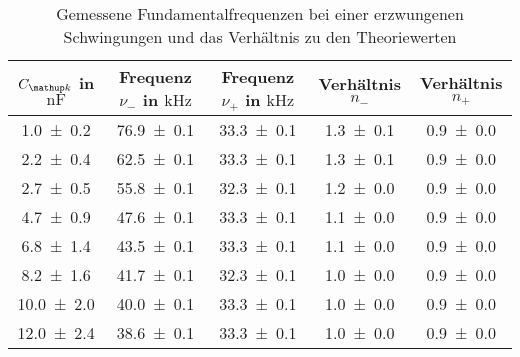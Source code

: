 \begin{table} 
\centering 
\caption{Gemessene Fundamentalfrequenzen bei einer erzwungenen Schwingungen und das Verhältnis zu den Theoriewerten} 
\label{fig:teilb_schwingungen_prak_theo} 
\begin{tabular}{S S S S S } 
\toprule  
{$C\ua{k}$ in $\si{\nano\farad}$} & {Frequenz $\nu_-$ in $\si{\kilo\hertz}$} & {Frequenz $\nu_+$ in $\si{\kilo\hertz}$}& {Verhältnis $n_-$} & {Verhältnis $n_+$}  \\ 
\midrule  
 \num{1.0\pm0.2} & \num{76.9\pm0.1} & \num{33.3\pm0.1} & \num{1.3\pm0.1} & \num{0.9\pm0.0}\\ 
\num{2.2\pm0.4} & \num{62.5\pm0.1} & \num{33.3\pm0.1} & \num{1.3\pm0.1} & \num{0.9\pm0.0}\\ 
\num{2.7\pm0.5} & \num{55.8\pm0.1} & \num{32.3\pm0.1} & \num{1.2\pm0.0} & \num{0.9\pm0.0}\\ 
\num{4.7\pm0.9} & \num{47.6\pm0.1} & \num{33.3\pm0.1} & \num{1.1\pm0.0} & \num{0.9\pm0.0}\\ 
\num{6.8\pm1.4} & \num{43.5\pm0.1} & \num{33.3\pm0.1} & \num{1.1\pm0.0} & \num{0.9\pm0.0}\\ 
\num{8.2\pm1.6} & \num{41.7\pm0.1} & \num{32.3\pm0.1} & \num{1.0\pm0.0} & \num{0.9\pm0.0}\\ 
\num{10.0\pm2.0} & \num{40.0\pm0.1} & \num{33.3\pm0.1} & \num{1.0\pm0.0} & \num{0.9\pm0.0}\\ 
\num{12.0\pm2.4} & \num{38.6\pm0.1} & \num{33.3\pm0.1} & \num{1.0\pm0.0} & \num{0.9\pm0.0}\\ 
\bottomrule 
\end{tabular} 
\end{table}